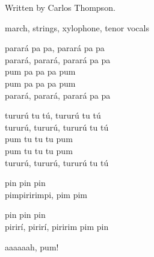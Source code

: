 
\begin{notes}
Written by Carlos Thompson.
\end{notes}
\begin{style}
march, strings, xylophone, tenor vocals
\end{style}
\begin{lyrics}
parará pa pa, parará pa pa\\
parará, parará, parará pa pa\\
pum pa pa pa pum\\
pum pa pa pa pum\\
parará, parará, parará pa pa

tururú tu tú, tururú tu tú\\
tururú, tururú, tururú tu tú\\
pum tu tu tu pum\\
pum tu tu tu pum\\
tururú, tururú, tururú tu tú

pin pin pin\\
pimpiririmpi, pim pim

pin pin pin\\
pirirí, pirirí, piririm pim pin

aaaaaah, pum!
\end{lyrics}

